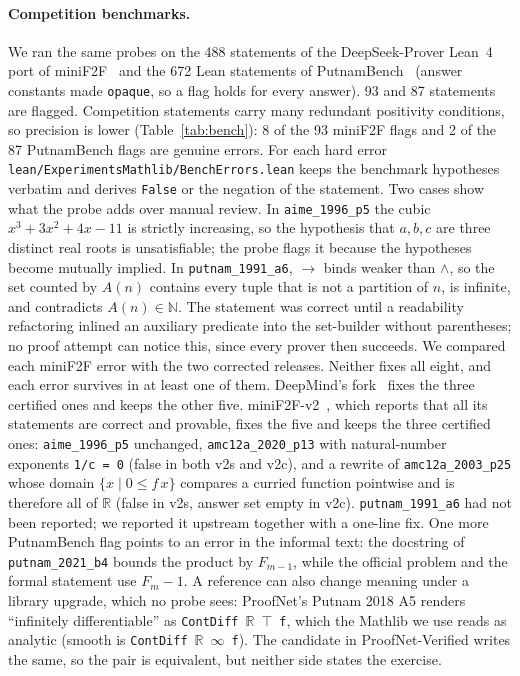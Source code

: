 \documentclass[10pt]{article}
\theoremstyle{definition}
\newif\ifanonymous
\begin{document}
\paragraph{Competition benchmarks.} We ran the same probes on the 488 statements of the
DeepSeek-Prover Lean~4 port of miniF2F~\cite{minif2f} and the 672 Lean statements of
PutnamBench~\cite{putnambench} (answer constants made \texttt{opaque}, so a flag holds for every
answer). 93 and 87 statements are flagged. Competition statements carry many redundant
positivity conditions, so precision is lower (Table~\ref{tab:bench}): 8 of the 93 miniF2F flags
and 2 of the 87 PutnamBench flags are genuine errors. For each hard error
\texttt{lean/ExperimentsMathlib/BenchErrors.lean} keeps the benchmark hypotheses verbatim and
derives \texttt{False} or the negation of the statement. Two cases show what the probe adds over
manual review. In \texttt{aime\_1996\_p5} the cubic $x^3+3x^2+4x-11$ is strictly increasing, so
the hypothesis that $a,b,c$ are three distinct real roots is unsatisfiable; the probe flags it
because the hypotheses become mutually implied. In \texttt{putnam\_1991\_a6}, $\to$ binds
weaker than $\wedge$, so the set counted by $A(n)$ contains every tuple that is not a partition
of $n$, is infinite, and contradicts $A(n)\in\mathbb N$. The statement was correct until a
readability refactoring inlined an auxiliary predicate into the set-builder without
parentheses; no proof attempt can notice this, since every prover then succeeds. We compared each miniF2F error with the
two corrected releases. Neither fixes all eight, and each error survives in at least one of
them. DeepMind's fork~\cite{minif2fdm} fixes the three certified ones and keeps the other five.
miniF2F-v2~\cite{minif2fv2}, which reports that all its statements are correct and provable,
fixes the five and keeps the three certified ones:
\texttt{aime\_1996\_p5} unchanged, \texttt{amc12a\_2020\_p13} with natural-number exponents
\texttt{1/c = 0} (false in both v2s and v2c), and a rewrite of \texttt{amc12a\_2003\_p25} whose
domain $\{x\mid 0\le f\,x\}$ compares a curried function pointwise and is therefore all of
$\mathbb R$ (false in v2s, answer set empty in v2c). \texttt{putnam\_1991\_a6} had not been reported;
\ifanonymous it has since been reported to the maintainers with a one-line fix.\else we reported it
upstream together with a one-line fix.\fi{} One more
PutnamBench flag points to an error in the informal text: the docstring of
\texttt{putnam\_2021\_b4} bounds the product by $F_{m-1}$, while the official problem and the
formal statement use $F_m-1$. A reference can also change meaning under a library upgrade,
which no probe sees: ProofNet's Putnam 2018 A5 renders ``infinitely differentiable'' as
\texttt{ContDiff}~$\mathbb R$~$\top$~\texttt{f}, which the Mathlib we use reads as analytic
(smooth is \texttt{ContDiff}~$\mathbb R$~$\infty$~\texttt{f}). The candidate in ProofNet-Verified writes the same, so the pair is
equivalent, but neither side states the exercise.
\end{document}
